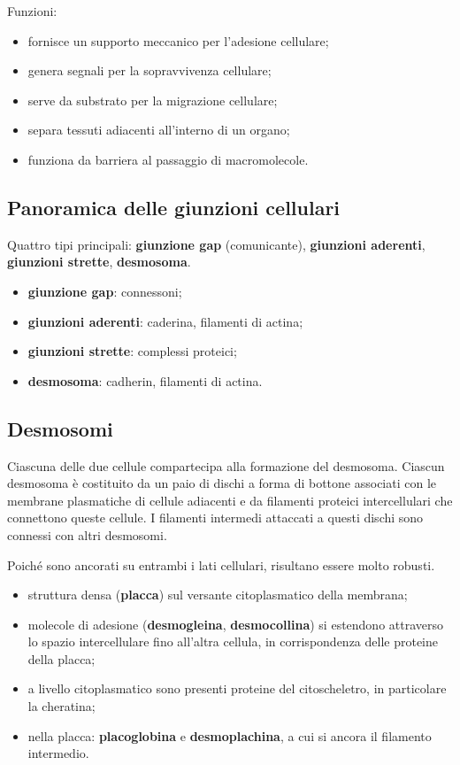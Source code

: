 Funzioni:
\begin{itemize}
  \item fornisce un supporto meccanico per l'adesione cellulare;
  \item genera segnali per la sopravvivenza cellulare;
  \item serve da substrato per la migrazione cellulare;
  \item separa tessuti adiacenti all'interno di un organo;
  \item funziona da barriera al passaggio di macromolecole.
\end{itemize}

\subsection{Panoramica delle giunzioni cellulari}

Quattro tipi principali: \textbf{giunzione gap} (comunicante), \textbf{giunzioni aderenti}, \textbf{giunzioni strette}, \textbf{desmosoma}.
\begin{itemize}
  \item \textbf{giunzione gap}: connessoni;
  \item \textbf{giunzioni aderenti}: caderina, filamenti di actina;
  \item \textbf{giunzioni strette}: complessi proteici;
  \item \textbf{desmosoma}: cadherin, filamenti di actina.
\end{itemize}

\subsection{Desmosomi}

Ciascuna delle due cellule compartecipa alla formazione del desmosoma. Ciascun desmosoma è costituito da un paio di dischi a forma di bottone associati con le membrane plasmatiche di cellule adiacenti e da filamenti proteici intercellulari che connettono queste cellule. I filamenti intermedi attaccati a questi dischi sono connessi con altri desmosomi.

Poiché sono ancorati su entrambi i lati cellulari, risultano essere molto robusti.

\begin{itemize}
  \item struttura densa (\textbf{placca}) sul versante citoplasmatico della membrana;
  \item molecole di adesione (\textbf{desmogleina}, \textbf{desmocollina}) si estendono attraverso lo spazio intercellulare fino all'altra cellula, in corrispondenza delle proteine della placca;
  \item a livello citoplasmatico sono presenti proteine del citoscheletro, in particolare la cheratina;
  \item nella placca: \textbf{placoglobina} e \textbf{desmoplachina}, a cui si ancora il filamento intermedio.
\end{itemize}

